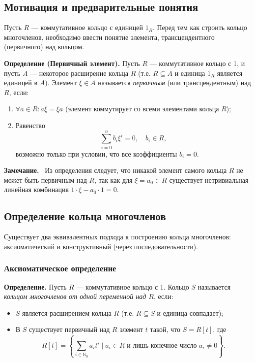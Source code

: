 \documentclass[a4paper,12pt]{article}
\newcommand{\myremark}{\textbf{Замечание.}\ }
\theoremstyle{definition}
\theoremstyle{plain}
\theoremstyle{remark}
\begin{document}
	\subsection{Мотивация и предварительные понятия}
	
	Пусть \( R \) — коммутативное кольцо с единицей \( 1_R \). Перед тем как строить кольцо многочленов, необходимо ввести понятие элемента, трансцендентного (первичного) над кольцом.
	
	\medskip
	
	\noindent \textbf{Определение (Первичный элемент).} 
	Пусть \( R \) — коммутативное кольцо с 1, и пусть \( A \) — некоторое расширение кольца \( R \) (т.е. \( R \subseteq A \) и единица \( 1_R \) является единицей в \( A \)). Элемент \( \xi \in A \) называется \textit{первичным} (или трансцендентным) над \( R \), если:
	\begin{enumerate}
		\item \( \forall a \in R: a\xi = \xi a \) (элемент коммутирует со всеми элементами кольца \( R \));
		\item Равенство 
		\[
		\sum_{i=0}^{n} b_i \xi^i = 0, \quad b_i \in R,
		\]
		возможно только при условии, что все коэффициенты \( b_i = 0 \).
	\end{enumerate}
	
	\myremark
	Из определения следует, что никакой элемент самого кольца \( R \) не может быть первичным над \( R \), так как для \( \xi = a_0 \in R \) существует нетривиальная линейная комбинация \( 1 \cdot \xi - a_0 \cdot 1 = 0 \).
	
	\subsection{Определение кольца многочленов}
	
	Существует два эквивалентных подхода к построению кольца многочленов: аксиоматический и конструктивный (через последовательности).
	
	\subsubsection*{Аксиоматическое определение}
	
	\noindent \textbf{Определение.} Пусть \( R \) — коммутативное кольцо с 1. Кольцо \( S \) называется \textit{кольцом многочленов от одной переменной над \( R \)}, если:
	\begin{itemize}
		\item \( S \) является расширением кольца \( R \) (т.е. \( R \subseteq S \) и единица совпадает);
		\item В \( S \) существует первичный над \( R \) элемент \( t \) такой, что \( S = R[t] \), где
		\[
		R[t] = \left\{ \sum_{i \in \mathbb{N}_0} a_i t^i \mid a_i \in R \text{ и лишь конечное число } a_i \neq 0 \right\}.
		\]
	\end{itemize}
	
\end{document}
